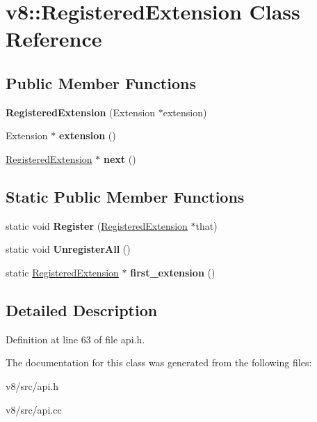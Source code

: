 \hypertarget{classv8_1_1RegisteredExtension}{}\section{v8\+:\+:Registered\+Extension Class Reference}
\label{classv8_1_1RegisteredExtension}
\subsection*{Public Member Functions}
\begin{DoxyCompactItemize}
\item 
\mbox{\label{classv8_1_1RegisteredExtension_ae35b6424afab40f3949c99a407ee2836}} 
{\bfseries Registered\+Extension} (Extension $\ast$extension)
\item 
\mbox{\label{classv8_1_1RegisteredExtension_a84de5a581f562ad1b12f137471a42258}} 
Extension $\ast$ {\bfseries extension} ()
\item 
\mbox{\label{classv8_1_1RegisteredExtension_a5863f0a2b1da0565c2baef1a0783d21a}} 
\mbox{\hyperlink{classv8_1_1RegisteredExtension}{Registered\+Extension}} $\ast$ {\bfseries next} ()
\end{DoxyCompactItemize}
\subsection*{Static Public Member Functions}
\begin{DoxyCompactItemize}
\item 
\mbox{\label{classv8_1_1RegisteredExtension_a72fd9f2241a87703870e11c475c6f471}} 
static void {\bfseries Register} (\mbox{\hyperlink{classv8_1_1RegisteredExtension}{Registered\+Extension}} $\ast$that)
\item 
\mbox{\label{classv8_1_1RegisteredExtension_a77b6380f53298a8a5c22f9900d4bd194}} 
static void {\bfseries Unregister\+All} ()
\item 
\mbox{\label{classv8_1_1RegisteredExtension_afa3d987dc559af8c07555a817d907698}} 
static \mbox{\hyperlink{classv8_1_1RegisteredExtension}{Registered\+Extension}} $\ast$ {\bfseries first\+\_\+extension} ()
\end{DoxyCompactItemize}


\subsection{Detailed Description}


Definition at line 63 of file api.\+h.



The documentation for this class was generated from the following files\+:\begin{DoxyCompactItemize}
\item 
v8/src/api.\+h\item 
v8/src/api.\+cc\end{DoxyCompactItemize}
